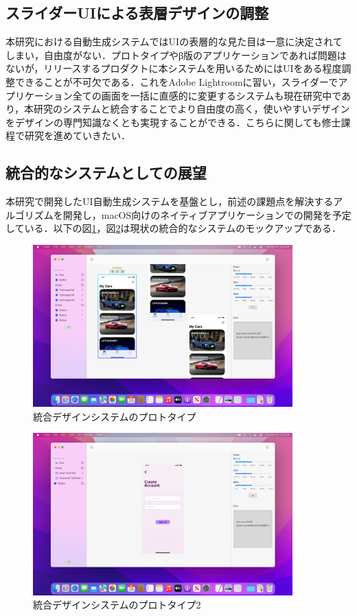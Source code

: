 \subsection{スライダーUIによる表層デザインの調整}
本研究における自動生成システムではUIの表層的な見た目は一意に決定されてしまい，自由度がない．プロトタイプやβ版のアプリケーションであれば問題はないが，リリースするプロダクトに本システムを用いるためにはUIをある程度調整できることが不可欠である．これをAdobe Lightroomに習い，スライダーでアプリケーション全ての画面を一括に直感的に変更するシステムも現在研究中であり，本研究のシステムと統合することでより自由度の高く，使いやすいデザインをデザインの専門知識なくとも実現することができる．こちらに関しても修士課程で研究を進めていきたい．

\subsection{統合的なシステムとしての展望}
本研究で開発したUI自動生成システムを基盤とし，前述の課題点を解決するアルゴリズムを開発し，macOS向けのネイティブアプリケーションでの開発を予定している．以下の図\ref{fig:autogen-integrated}，図\ref{fig:autogen-integrated2}は現状の統合的なシステムのモックアップである．

\begin{figure}[htbp]
  \begin{minipage}{\hsize}
    \begin{center}
       \includegraphics[width=100mm]{img/autogen-integrated.png}
    \end{center}
    \caption{統合デザインシステムのプロトタイプ}
    \label{fig:autogen-integrated}
  \end{minipage}
\end{figure}


\begin{figure}[htbp]
  \begin{minipage}{\hsize}
    \begin{center}
       \includegraphics[width=100mm]{img/autogen-integrated2.png}
    \end{center}
    \caption{統合デザインシステムのプロトタイプ2}
    \label{fig:autogen-integrated2}
  \end{minipage}
\end{figure}

